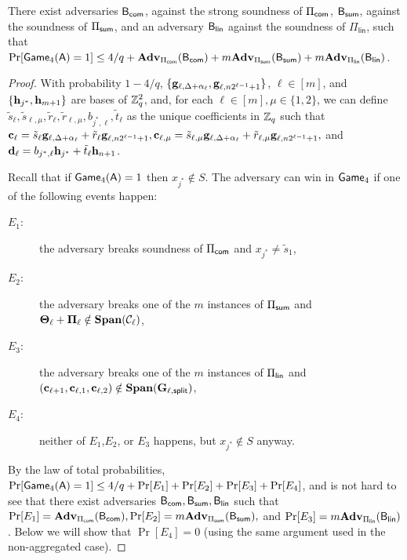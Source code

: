 \begin{lemma}
There exist adversaries \(\mathsf{B}_{\mathsf{com}}\), against the strong soundness of \(\Pi_{\mathsf{com}}\), \(\mathsf{B}_{\mathsf{sum}}\), against the soundness of \(\Pi_{\mathsf{sum}}\), and an adversary \(\mathsf{B}_\mathsf{lin}\) against the soundness of \(\Pi_\mathsf{lin}\), such that \(\Pr[\mathsf{Game}_4(\mathsf{A})=1]\leq 4/q+ \mathbf{Adv}_{\Pi_{\mathsf{com}}}(\mathsf{B}_{\mathsf{com}})+m\mathbf{Adv}_{\Pi_{\mathsf{sum}}}(\mathsf{B}_{\mathsf{sum}})+m\mathbf{Adv}_{\Pi_\mathsf{lin}}(\mathsf{B}_\mathsf{lin})\).
\end{lemma}
\begin{proof}
With probability \(1-4/q\), \(\{\mathbf{g}_{\ell,\Delta+\alpha_\ell},\mathbf{g}_{\ell,n2^{\ell-1}+1}\}\), \(\ell\in [m]\), and \(\{\mathbf{h}_{j^*},\allowbreak \mathbf{h}_{m+1}\}\) are bases of \(\mathbb{Z}_q^2\),
and, for each \(\ell\in [m],\mu\in\{1,2\}\), we can define \(\tilde{s}_\ell,\tilde{s}_{\ell,\mu},\tilde{r}_\ell,\tilde{r}_{\ell,\mu},b_{j^*,\ell},\tilde{t}_\ell\) as the unique coefficients in \(\mathbb{Z}_q\) such that \(\mathbf{c}_\ell=\allowbreak \tilde{s}_\ell\mathbf{g}_{\ell,\Delta+\alpha_\ell} + \tilde{r}_\ell \mathbf{g}_{\ell,n2^{\ell-1}+1}, \mathbf{c}_{\ell,\mu}=\tilde{s}_{\ell,\mu}\mathbf{g}_{\ell,\Delta+\alpha_\ell} + \tilde{r}_{\ell,\mu} \mathbf{g}_{\ell,n2^{\ell-1}+1},\) and \(\mathbf{d}_\ell= b_{j^*,\ell} \mathbf{h}_{j^*} + \tilde{t}_\ell \mathbf{h}_{n+1}\).

Recall that if \(\mathsf{Game}_4(\mathsf{A})=1\) then \(x_{j^*}\notin S\). The adversary can win in \(\mathsf{Game}_4\) if one of the following events happen:
\begin{description}
\item[\(E_1\):] the adversary breaks soundness of \(\Pi_{\mathsf{com}}\) and \(x_{j^*}\neq \tilde{s}_1\),
\item[\(E_2\):] the adversary breaks one of the \(m\)  instances of \(\Pi_{\mathsf{sum}}\) and \(\mathbf{{\Theta}}_\ell+\mathbf{{\Pi}}_\ell\notin\mathbf{Span}(\mathcal{C}_\ell)\),
\item[\(E_3\):] the adversary breaks one of the \(m\) instances of \(\Pi_{\mathsf{lin}}\) and \((\mathbf{c}_{\ell+1},\mathbf{c}_{\ell,1},\mathbf{c}_{\ell,2})\notin\mathbf{Span}(\mathbf{{G}}_{\ell,\mathsf{split}})\),
\item[\(E_4\):] neither of \(E_1\),\(E_2\), or \(E_3\) happens, but \(x_{j^*}\notin S\) anyway.
\end{description}
By the law of total probabilities, \(\Pr[\mathsf{Game}_4(\mathsf{A})=1]\leq 4/q+\Pr[E_1]+\Pr[E_2]+\Pr[E_3]+\Pr[E_4]\), and is not hard to see that there exist adversaries \(\mathsf{B}_{\mathsf{com}},\mathsf{B}_{\mathsf{sum}},\mathsf{B}_\mathsf{lin}\) such that \(\Pr[E_1]=\mathbf{Adv}_{\Pi_{\mathsf{com}}}(\mathsf{B}_{\mathsf{com}}),\Pr[E_2]=m\mathbf{Adv}_{\Pi_{\mathsf{sum}}}(\mathsf{B}_{\mathsf{sum}}),\) and \(\Pr[E_3]=m\mathbf{Adv}_{\Pi_\mathsf{lin}}(\mathsf{B}_\mathsf{lin})\). Below we will show that \(\Pr[E_4]=0\) (using the same argument used in the non-aggregated case).


\end{proof}

